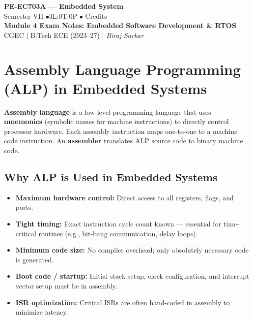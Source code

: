 \documentclass[12pt,a4paper]{article}
\begin{document}

\begin{center}
  {\LARGE\bfseries\color{myred} PE-EC703A --- Embedded System}\\[5pt]
  {\normalsize\color{mydark} Semester VII \quad$\bullet$\quad 3L:0T:0P \quad$\bullet$ Credits}\\[3pt]
  {\normalsize\color{myteal}\textbf{Module 4 Exam Notes: Embedded Software Development \& RTOS}}\\[3pt]
  {\small\color{mydark} CGEC \;$|$\; B.Tech ECE (2023--27) \;$|$\; \textit{Biraj Sarkar}}
\end{center}
\vspace{2pt}
\noindent{\color{myred}\rule{\linewidth}{1.5pt}}
\vspace{2pt}

\hypersetup{linkcolor=mydark}
\tableofcontents
\hypersetup{linkcolor=myteal}
\newpage

\section{Assembly Language Programming (ALP) in Embedded Systems}

\begin{tcolorbox}[defbox, title={\textbf{Assembly Language Programming (ALP)}}]
\textbf{Assembly language} is a low-level programming language that uses \textbf{mnemonics} (symbolic names for machine instructions) to directly control processor hardware. Each assembly instruction maps one-to-one to a machine code instruction. An \textbf{assembler} translates ALP source code to binary machine code.
\end{tcolorbox}

\subsection{Why ALP is Used in Embedded Systems}
\begin{itemize}[leftmargin=*, itemsep=3pt]
  \item \textbf{Maximum hardware control:} Direct access to all registers, flags, and ports.
  \item \textbf{Tight timing:} Exact instruction cycle count known --- essential for time-critical routines (e.g., bit-bang communication, delay loops).
  \item \textbf{Minimum code size:} No compiler overhead; only absolutely necessary code is generated.
  \item \textbf{Boot code / startup:} Initial stack setup, clock configuration, and interrupt vector setup must be in assembly.
  \item \textbf{ISR optimization:} Critical ISRs are often hand-coded in assembly to minimize latency.
\end{itemize}
\end{document}
